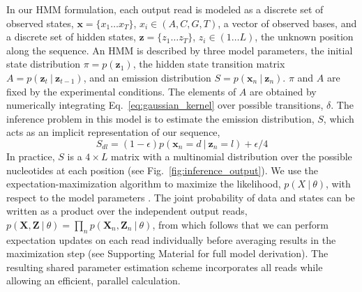 \documentclass{biophys_letter}
\newcommand{\err}{\epsilon}
\newcommand{\kje}[1]{\textcolor{BurntOrange}{#1}}
\begin{document}
In our HMM formulation, each output read is modeled as a discrete set of observed states, $\mathbf{x}=\{x_{1}\dots x_{T}\}$, $x_i \in (A,C,G,T)$, a vector of observed bases, and a discrete set of hidden states, $\mathbf{z}=\{z_{1} \dots z_{T}\}$, $z_i \in (1 \dots L)$, the unknown position along the sequence.
An HMM is described by three model parameters, the initial state distribution $\pi=p(\mathbf{z}_{1})$, the hidden state transition matrix $A=p(\mathbf{z}_{t}\:|\:\mathbf{z}_{t-1})$, and an emission distribution $S=p(\mathbf{x}_{n}\:|\:\mathbf{z}_{n})$.
$\pi$ and $A$ are fixed by the experimental conditions.
\kje{The elements of $A$ are obtained by numerically integrating Eq.~\ref{eq:gaussian_kernel} over possible transitions, $\delta$.}
The inference problem in this model is to estimate the emission distribution, $S$, which acts as an implicit representation of our sequence,
\begin{equation}
  S_{dl} = (1-\err)p(\mathbf{x}_n = d\:|\:\mathbf{z}_{n} = l) + \err/4
\end{equation}
In practice, $S$ is a $4 \times L$ matrix with a multinomial distribution over the possible nucleotides at each position (see Fig.~\ref{fig:inference_output}).
\kje{We use the expectation-maximization algorithm to maximize the likelihood, $p(X \:|\: \theta)$, with respect to the model parameters \cite{Baum:1970}.}
The joint probability of data and states can be written as a product over the independent output reads, $p(\mathbf{X},\mathbf{Z}\:|\:\theta)=\prod_{n}p(\mathbf{X}_n,\mathbf{Z}_n\:|\:\theta)$, from which follows that we can perform expectation updates on each read individually before averaging results in the maximization step (see Supporting Material for full model derivation).
The resulting shared parameter estimation scheme incorporates all reads while allowing an efficient, parallel calculation.
\end{document}
